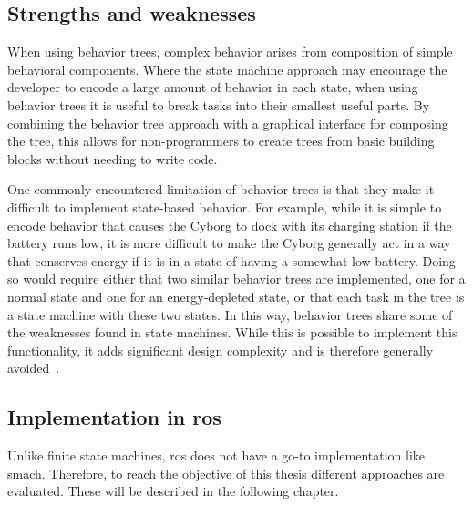 \documentclass[\rootfolder/main.tex]{subfiles}
\begin{document}

\subsection{Strengths and weaknesses}

When using behavior trees, complex behavior arises from composition of simple behavioral components.
Where the state machine approach may encourage the developer to encode a large amount of behavior in each state, when using behavior trees it is useful to break tasks into their smallest useful parts.
By combining the behavior tree approach with a graphical interface for composing the tree, this allows for non-programmers to create trees from basic building blocks without needing to write code.

One commonly encountered limitation of behavior trees is that they make it difficult to implement state-based behavior.
For example, while it is simple to encode behavior that causes the Cyborg to dock with its charging station if the battery runs low, it is more difficult to make the Cyborg generally act in a way that conserves energy if it is in a state of having a somewhat low battery.
Doing so would require either that two similar behavior trees are implemented, one for a normal state and one for an energy-depleted state, or that each task in the tree is a state machine with these two states.
In this way, behavior trees share some of the weaknesses found in state machines.
While this is possible to implement this functionality, it adds significant design complexity and is therefore generally avoided~\cite{Millington2009}.


\subsection{Implementation in \acrshort{ros}}

Unlike finite state machines, \acrshort{ros} does not have a go-to implementation like \acrshort{smach}.
Therefore, to reach the objective of this thesis different approaches are evaluated.
These will be described in the following chapter.
\end{document}
